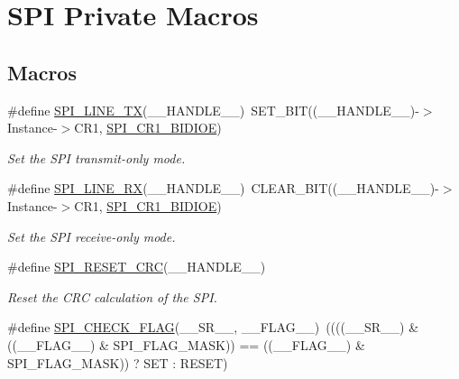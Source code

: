 \hypertarget{group___s_p_i___private___macros}{}\section{S\+PI Private Macros}
\label{group___s_p_i___private___macros}
\subsection*{Macros}
\begin{DoxyCompactItemize}
\item 
\#define \mbox{\hyperlink{group___s_p_i___private___macros_gae3b2eb5e818e58b66474d42dedac5523}{S\+P\+I\+\_\+L\+I\+N\+E\+\_\+\+TX}}(\+\_\+\+\_\+\+H\+A\+N\+D\+L\+E\+\_\+\+\_\+)~S\+E\+T\+\_\+\+B\+IT((\+\_\+\+\_\+\+H\+A\+N\+D\+L\+E\+\_\+\+\_\+)-\/$>$Instance-\/$>$C\+R1, \mbox{\hyperlink{group___peripheral___registers___bits___definition_ga378953916b7701bd49f063c0366b703f}{S\+P\+I\+\_\+\+C\+R1\+\_\+\+B\+I\+D\+I\+OE}})
\begin{DoxyCompactList}\small\item\em Set the S\+PI transmit-\/only mode. \end{DoxyCompactList}\item 
\#define \mbox{\hyperlink{group___s_p_i___private___macros_gaa8d58cef91c1874d5a4dde4014cf6269}{S\+P\+I\+\_\+L\+I\+N\+E\+\_\+\+RX}}(\+\_\+\+\_\+\+H\+A\+N\+D\+L\+E\+\_\+\+\_\+)~C\+L\+E\+A\+R\+\_\+\+B\+IT((\+\_\+\+\_\+\+H\+A\+N\+D\+L\+E\+\_\+\+\_\+)-\/$>$Instance-\/$>$C\+R1, \mbox{\hyperlink{group___peripheral___registers___bits___definition_ga378953916b7701bd49f063c0366b703f}{S\+P\+I\+\_\+\+C\+R1\+\_\+\+B\+I\+D\+I\+OE}})
\begin{DoxyCompactList}\small\item\em Set the S\+PI receive-\/only mode. \end{DoxyCompactList}\item 
\#define \mbox{\hyperlink{group___s_p_i___private___macros_gab120a0085b72939e7d19c4f6b3381a99}{S\+P\+I\+\_\+\+R\+E\+S\+E\+T\+\_\+\+C\+RC}}(\+\_\+\+\_\+\+H\+A\+N\+D\+L\+E\+\_\+\+\_\+)
\begin{DoxyCompactList}\small\item\em Reset the C\+RC calculation of the S\+PI. \end{DoxyCompactList}\item 
\#define \mbox{\hyperlink{group___s_p_i___private___macros_gae9c6be610681f2142fb012de95e6e59d}{S\+P\+I\+\_\+\+C\+H\+E\+C\+K\+\_\+\+F\+L\+AG}}(\+\_\+\+\_\+\+S\+R\+\_\+\+\_\+,  \+\_\+\+\_\+\+F\+L\+A\+G\+\_\+\+\_\+)~((((\+\_\+\+\_\+\+S\+R\+\_\+\+\_\+) \& ((\+\_\+\+\_\+\+F\+L\+A\+G\+\_\+\+\_\+) \& S\+P\+I\+\_\+\+F\+L\+A\+G\+\_\+\+M\+A\+SK)) == ((\+\_\+\+\_\+\+F\+L\+A\+G\+\_\+\+\_\+) \& S\+P\+I\+\_\+\+F\+L\+A\+G\+\_\+\+M\+A\+SK)) ? S\+ET \+: R\+E\+S\+ET)

\end{DoxyCompactItemize}
